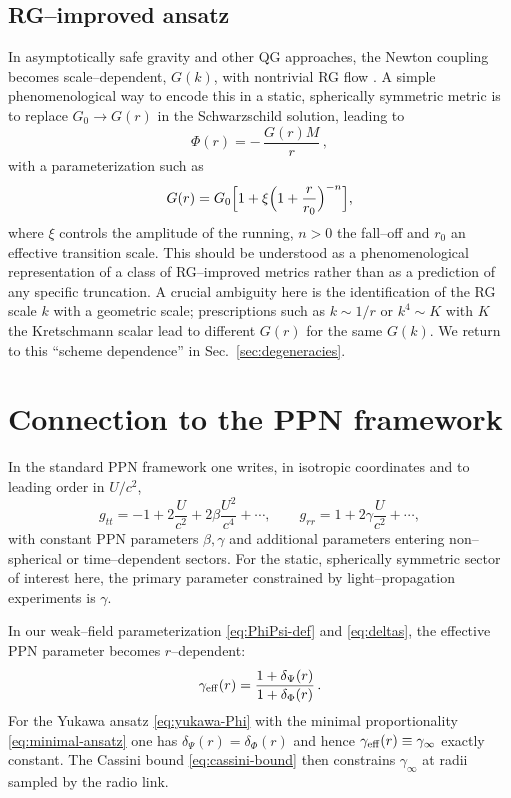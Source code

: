 \documentclass[11pt,a4paper]{article}
\begin{document}
\subsection{RG--improved ansatz}

In asymptotically safe gravity and other QG approaches, the Newton coupling becomes scale--dependent, $G(k)$, with nontrivial RG flow \cite{ReuterSaueressig2012}. A simple phenomenological way to encode this in a static, spherically symmetric metric is to replace $G_0\to G(r)$ in the Schwarzschild solution, leading to
\begin{equation}
\Phi(r) = -\,\frac{G(r) M}{r}\,,
\end{equation}
with a parameterization such as
\begin{equation}
G(r) = G_0\Bigl[1 + \xi\Bigl(1 + \frac{r}{r_0}\Bigr)^{-n}\Bigr],
\label{eq:G-of-r}
\end{equation}
where $\xi$ controls the amplitude of the running, $n>0$ the fall--off and $r_0$ an effective transition scale. This should be understood as a phenomenological representation of a class of RG--improved metrics rather than as a prediction of any specific truncation. A crucial ambiguity here is the identification of the RG scale $k$ with a geometric scale; prescriptions such as $k\sim 1/r$ or $k^4\sim K$ with $K$ the Kretschmann scalar lead to different $G(r)$ for the same $G(k)$. We return to this ``scheme dependence'' in Sec.~\ref{sec:degeneracies}.

\section{Connection to the PPN framework}
\label{sec:ppn}

In the standard PPN framework \cite{Will2014,Will2018} one writes, in isotropic coordinates and to leading order in $U/c^2$,
\begin{equation}
g_{tt} = -1 + 2\frac{U}{c^2} + 2\beta\frac{U^2}{c^4} + \cdots,\qquad
g_{rr} = 1 + 2\gamma\frac{U}{c^2} + \cdots,
\end{equation}
with constant PPN parameters $\beta,\gamma$ and additional parameters entering non--spherical or time--dependent sectors. For the static, spherically symmetric sector of interest here, the primary parameter constrained by light--propagation experiments is $\gamma$.

In our weak--field parameterization \eqref{eq:PhiPsi-def} and \eqref{eq:deltas}, the effective PPN parameter becomes $r$--dependent:
\begin{equation}
\gamma_{\rm eff}(r) = \frac{1+\delta_\Psi(r)}{1+\delta_\Phi(r)}\,.
\end{equation}
For the Yukawa ansatz \eqref{eq:yukawa-Phi} with the minimal proportionality \eqref{eq:minimal-ansatz} one has $\delta_\Psi(r) = \delta_\Phi(r)$ and hence $\gamma_{\rm eff}(r) \equiv \gamma_\infty$ exactly constant. The Cassini bound \eqref{eq:cassini-bound} then constrains $\gamma_\infty$ at radii sampled by the radio link.
\end{document}
